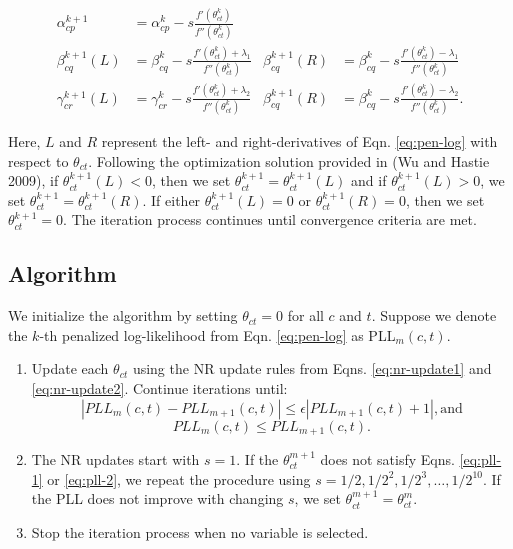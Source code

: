 \begin{align*}
\alpha_{cp}^{k+1} & = \alpha_{cp}^{k} - s \frac{f' \left(\theta_{ct}^{k} \right)}{f''\left(\theta_{ct}^{k}\right)} \\
\beta_{cq}^{k+1} (L) & = \beta_{cq}^{k} - s \frac{f' \left(\theta_{ct}^{k} \right) + \lambda_1}{f''\left(\theta_{ct}^{k}\right)}   &   \beta_{cq}^{k+1} (R) & = \beta_{cq}^{k} - s \frac{f' \left(\theta_{ct}^{k} \right) - \lambda_1}{f''\left(\theta_{ct}^{k}\right)}  \\
\gamma_{cr}^{k+1} (L) & = \gamma_{cr}^{k} - s \frac{f' \left(\theta_{ct}^{k} \right) + \lambda_2}{f''\left(\theta_{ct}^{k}\right)}   &   \beta_{cq}^{k+1} (R) & = \beta_{cq}^{k} - s \frac{f' \left(\theta_{ct}^{k} \right) - \lambda_2}{f''\left(\theta_{ct}^{k}\right)}.
\end{align*}

Here, $L$ and $R$ represent the left- and right-derivatives of Eqn. \ref{eq:pen-log} with respect to $\theta_{ct}$. Following the optimization solution provided in (Wu and Hastie 2009), if $\theta_{ct}^{k+1} (L) < 0$, then we set $\theta_{ct}^{k+1}  = \theta_{ct}^{k+1} (L)$ and if $\theta_{ct}^{k+1} (L) > 0$, we set $\theta_{ct}^{k+1}  = \theta_{ct}^{k+1} (R)$. If either $\theta_{ct}^{k+1} (L) = 0$ or $\theta_{ct}^{k+1} (R) = 0$, then we set $\theta_{ct}^{k+1}  = 0$. The iteration process continues until convergence criteria are met. \\

\subsection{Algorithm}

We initialize the algorithm by setting $\theta_{ct} = 0$ for all $c$ and $t$. Suppose we denote the $k$-th penalized log-likelihood from Eqn. \ref{eq:pen-log} as PLL$_m(c, t)$. 
\begin{enumerate}
    \item Update each $\theta_{ct}$  using the NR update rules from Eqns. \ref{eq:nr-update1} and \ref{eq:nr-update2}. Continue iterations until:
    \begin{equation} \label{eq:pll-1}
        |PLL_m(c, t) - PLL_{m+1}(c,t)| \leq \epsilon |PLL_{m+1}(c,t) + 1|, \text{and}
    \end{equation}
    \begin{equation}\label{eq:pll-2}
        PLL_m(c, t) \leq PLL_{m+1}(c,t).
    \end{equation}
    \item The NR updates start with $s = 1$. If the $\theta_{ct}^{m+1}$ does not satisfy Eqns. \ref{eq:pll-1} or \ref{eq:pll-2}, we repeat the procedure using $ s= 1/2, 1/2^2, 1/2^3, \dots, 1/2^10$. If the PLL does not improve with changing $s$, we set $\theta_{ct}^{m+1} = \theta_{ct}^{m}$.
    \item Stop the iteration process when no variable is selected. 
\end{enumerate}

